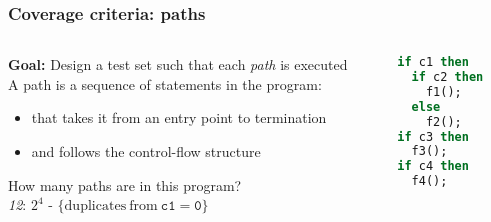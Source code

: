 \documentclass[10pt,xcolor={dvipsnames}]{beamer}
\begin{document}








\begin{frame}[fragile]

\frametitle{Coverage criteria: paths}

\begin{columns}
\begin{column}{0.55\textwidth}
\textbf{Goal:} Design a test set such that each \emph{path} is executed
\\[1em]

A path is a sequence of statements in the program:
\begin{itemize}
\item that takes it from an entry point to termination \\[0.5em]
\item and follows the control-flow structure \\[1.5em]
\end{itemize}

\pause
How many paths are in this program?
\\[1em]

\pause
\emph{12}: $2^4$ - $\{\mathrm{duplicates\ from\ } \mathtt{c1 = 0}\}$

\end{column}

\begin{column}{0.45\textwidth}
\begin{lstlisting}[language=Caml]
if c1 then
  if c2 then
    f1();
  else
    f2();
if c3 then
  f3();
if c4 then
  f4();
\end{lstlisting}

\end{column}

\end{columns}

\end{frame}
\end{document}
